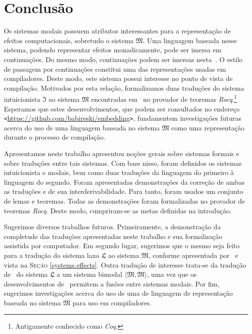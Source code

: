 \chapter{Conclusão}
    Os sistemas modais possuem atributos interessantes para a representação de efeitos computacionais, sobretudo o sistema $\mathfrak{M}$.
    Uma linguagem baseada nesse sistema, podendo representar efeitos monadicamente, pode ser imersa em continuações.
    Do mesmo modo, continuações podem ser imersas nesta~\citep{Filinski.1994}.
    O estilo de passagem por continuações constitui uma das representações usadas em compiladores.
    Deste modo, este sistema possui interesse no ponto de vista de compilação.
    Motivados por esta relação, formalizamos duas traduções do sistema intuicionista $\mathfrak{I}$ ao sistema $\mathfrak{M}$ encontradas em~\cite{Troelstra+Schwichtenberg.2000} no provador de teoremas \emph{Rocq}.\footnote{Antigamente conhecido como \emph{Coq}.}
    Esperamos que estes desenvolvimentos, que podem ser consultados no endereço \texttt{<}\url{https://github.com/babireski/embedding}\texttt{>}, fundamentem investigações futuras acerca do uso de uma linguagem baseada no sistema $\mathfrak{M}$ como uma representação durante o processo de compilação.

    \vspace{.5\baselineskip}
    Apresentamos neste trabalho apresentou noções gerais sobre sistemas formais e sobre traduções entre tais sistemas.
    Com base nisso, foram definidos os sistemas intuicionista e modais, bem como duas traduções da linguagem do primeiro à linguagem do segundo.
    Foram apresentadas demonstrações da correção de ambas as traduções e de sua interderivabilidade.
    Para tanto, foram usados um conjunto de lemas e teoremas.
    Todas as demonstrações foram formalizadas no provador de teoremas \emph{Rocq}.
    Deste modo, cumpriram-se as metas definidas na introdução.

    \vspace{.5\baselineskip}
    Sugerimos diversos trabalhos futuros. Primeiramente, a demonstração da completude das traduções apresentadas neste trabalho e sua formalização assistida por computador.
    Em segundo lugar, sugerimos que o mesmo seja feito para a tradução do sistema laxo $\mathfrak{L}$ ao sistema $\mathfrak{M}$, conforme apresentada por~\cite{Pfenning+Davies.2001} e vista na \textsc{Seção} \ref{systems.effects}.
    Outra tradução de interesse trata-se da tradução de~\cite{Fairtlough+Mendler.1997} do sistema $\mathfrak{L}$ a um sistema bimodal $\langle\mathfrak{M},\mathfrak{M}\rangle$, uma vez que os desenvolvimentos de~\cite{Nunes+others.2025} permitem a fusões entre sistemas modais.
    Por fim, sugerimos investigações acerca do uso de uma de linguagem de representação baseada no sistema $\mathfrak{M}$ para uso em compiladores.

